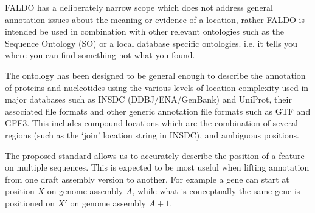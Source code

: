 FALDO has a deliberately narrow scope which does not address general annotation
issues about the meaning or evidence of a location, rather FALDO is intended be
used in combination with other relevant ontologies such as the Sequence Ontology
(SO) \cite{SequenceOntology2005} or a local database specific ontologies. 
i.e. it tells you where you can find something not what you found.

The ontology has been designed to be general enough to describe the annotation
of proteins and nucleotides using the various levels of location complexity used
in major databases such as INSDC (DDBJ/ENA/GenBank) and UniProt, their
associated file formats and other generic annotation file formats such as GTF
and GFF3. 
This includes compound locations which are the combination of
several regions (such as the `join' location string in INSDC), and ambiguous
positions.

The proposed standard allows us to accurately describe the position of a feature on multiple sequences.
This is expected to be most useful when lifting annotation from one draft assembly version to another.
For example a gene can start at position $X$ on genome assembly $A$,
while what is conceptually the same gene is positioned on $X'$ on genome assembly $A+1$.

